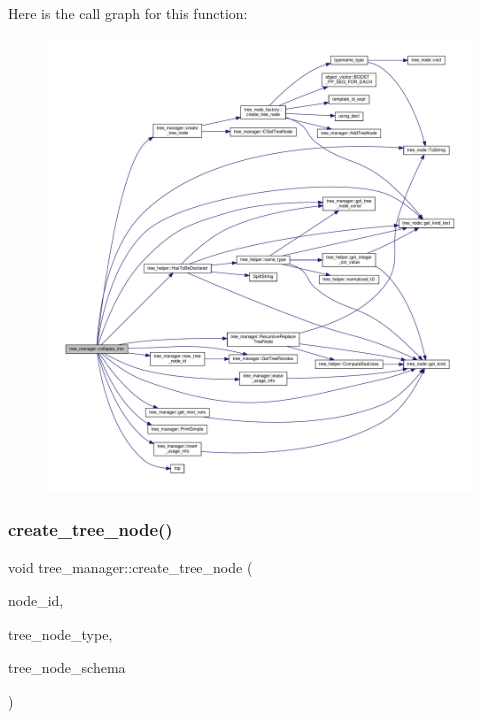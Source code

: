 Here is the call graph for this function\+:
\nopagebreak
\begin{figure}[H]
\begin{center}
\leavevmode
\includegraphics[width=350pt]{d2/ddd/classtree__manager_ac728a1e9ad1c48fe09936df555cb9980_cgraph}
\end{center}
\end{figure}
\mbox{\label{classtree__manager_a6a73965fdf587f77158f5dc384e037a1}} 
\subsubsection{\texorpdfstring{create\+\_\+tree\+\_\+node()}{create\_tree\_node()}}
{\footnotesize\ttfamily void tree\+\_\+manager\+::create\+\_\+tree\+\_\+node (\begin{DoxyParamCaption}\item[{const unsigned int}]{node\+\_\+id,  }\item[{enum \hyperlink{tree__common_8hpp_a9efbd7c7191fb190b76c2fd05d6e7b45}{kind}}]{tree\+\_\+node\+\_\+type,  }\item[{std\+::map$<$ \hyperlink{token__interface_8hpp_a14502d0757789149f644966ca931b126}{Tree\+Vocabulary\+Token\+Types\+\_\+\+Token\+Enum}, std\+::string $>$ \&}]{tree\+\_\+node\+\_\+schema }\end{DoxyParamCaption})}



